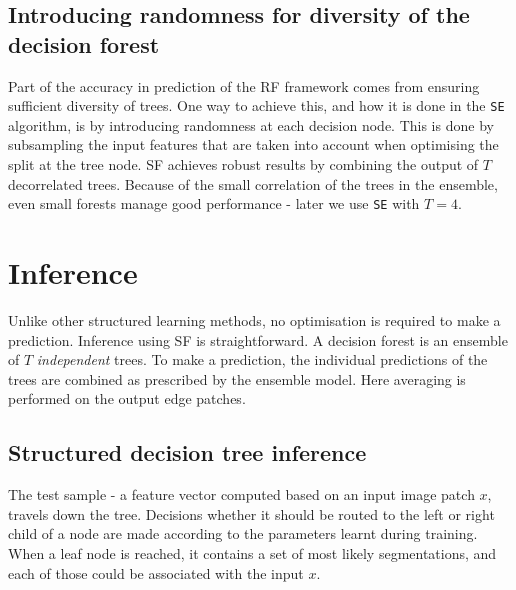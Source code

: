 \subsection{Introducing randomness for diversity of the decision forest}
Part of the accuracy in prediction of the RF framework comes from ensuring sufficient diversity of trees. One way to achieve this, and how it is done in the {\tt SE} algorithm, is by introducing randomness at each decision node. This is done by subsampling the input features that are taken into account when optimising the split at the tree node. SF achieves robust results by combining the output of $T$ decorrelated trees. Because of the small correlation of the trees in the ensemble, even small forests manage good performance - later we use {\tt SE} with $T=4$.

\section{Inference}
Unlike other structured learning methods, no optimisation is required to make a prediction. Inference using SF is straightforward. A decision forest is an ensemble of $T$ \textit{independent} trees. To make a prediction, the individual predictions of the trees are combined as prescribed by the ensemble model. Here averaging is performed on the output edge patches.

\subsection{Structured decision tree inference}
\label{sec:ch2-structured-forest-inference}
The test sample - a feature vector computed based on an input image patch $x$, travels down the tree. Decisions whether it should be routed to the left or right child of a node are made according to the parameters learnt during training. When a leaf node is reached, it contains a set of most likely segmentations, and each of those could be associated with the input $x$.

